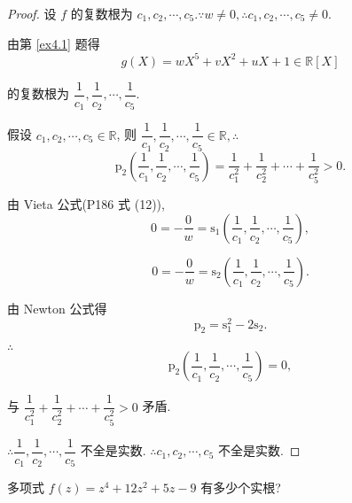 \documentclass[UTF8]{ctexart}
\begin{document}
\begin{proof}
    设 $f$ 的复数根为 $c_1,c_2,\cdots,c_5.\because w\neq0,\therefore c_1,c_2,\cdots,c_5\neq0$.
    
    由第 \ref{ex4.1} 题得
    \[g(X)=wX^5+vX^2+uX+1\in\mathbb{R}[X]\]

    的复数根为 $\dfrac{1}{c_1},\dfrac{1}{c_2},\cdots,\dfrac{1}{c_5}$.

    假设 $c_1,c_2,\cdots,c_5\in\mathbb{R}$, 则 $\dfrac{1}{c_1},\dfrac{1}{c_2},\cdots,\dfrac{1}{c_5}\in\mathbb{R},\therefore$
    \[\mathrm{p}_2\left(\dfrac{1}{c_1},\dfrac{1}{c_2},\cdots,\dfrac{1}{c_5}\right)=\dfrac{1}{c_1^2}+\dfrac{1}{c_2^2}+\cdots+\dfrac{1}{c_5^2}>0.\]    
    
    由 Vieta 公式(P186 式 (12)),
    \[0=-\dfrac{0}{w}=\mathrm{s}_1\left(\dfrac{1}{c_1},\dfrac{1}{c_2},\cdots,\dfrac{1}{c_5}\right),\]

    \[0=-\dfrac{0}{w}=\mathrm{s}_2\left(\dfrac{1}{c_1},\dfrac{1}{c_2},\cdots,\dfrac{1}{c_5}\right).\]

    由 Newton 公式得
    \[\mathrm{p}_2=\mathrm{s}_1^2-2\mathrm{s}_2.\]

    $\therefore$
    \[\mathrm{p}_2\left(\dfrac{1}{c_1},\dfrac{1}{c_2},\cdots,\dfrac{1}{c_5}\right)=0,\]

    与 $\dfrac{1}{c_1^2}+\dfrac{1}{c_2^2}+\cdots+\dfrac{1}{c_5^2}>0$ 矛盾.

    $\therefore\dfrac{1}{c_1},\dfrac{1}{c_2},\cdots,\dfrac{1}{c_5}$ 不全是实数. $\therefore c_1,c_2,\cdots,c_5$ 不全是实数.
\end{proof}
\addtocounter{exercise}{7}
\begin{exercise}%
    多项式 $f(z)=z^4+12z^2+5z-9$ 有多少个实根?
\end{exercise}
\end{document}
